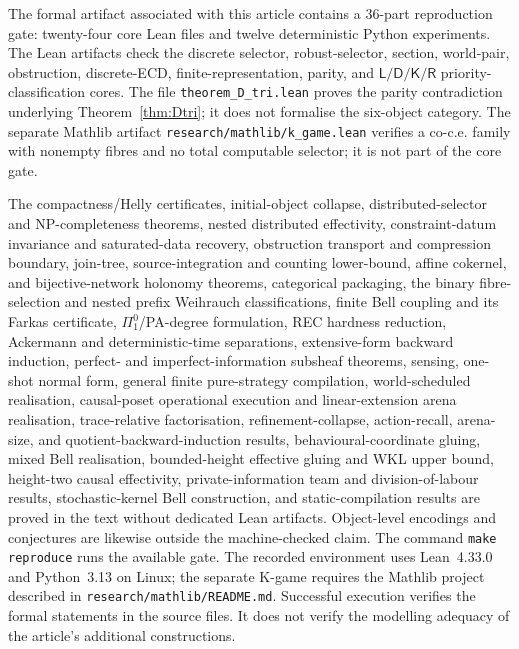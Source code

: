 \documentclass[11pt]{article}
\theoremstyle{plain}
\theoremstyle{definition}
\theoremstyle{remark}
\begin{document}
The formal artifact associated with this article contains a 36-part reproduction
gate: twenty-four core Lean files and twelve deterministic Python experiments.
The Lean artifacts check the discrete selector, robust-selector, section,
world-pair, obstruction, discrete-ECD, finite-representation, parity, and
$\mathsf L/\mathsf D/\mathsf K/\mathsf R$ priority-classification cores.
The file \texttt{theorem\_D\_tri.lean} proves the parity contradiction underlying
Theorem~\ref{thm:Dtri}; it does not formalise the six-object category. The
separate Mathlib artifact \texttt{research/mathlib/k\_game.lean} verifies a
co-c.e. family with nonempty fibres and no total computable selector; it is not
part of the core gate.

The compactness/Helly certificates, initial-object collapse, distributed-selector
and NP-completeness theorems, nested distributed effectivity,
constraint-datum invariance and saturated-data recovery, obstruction transport
and compression boundary, join-tree, source-integration and counting lower-bound, affine cokernel, and
bijective-network holonomy theorems, categorical packaging, the binary
fibre-selection and nested prefix Weihrauch classifications, finite Bell
coupling and its Farkas certificate, $\Pi^0_1$/PA-degree formulation, REC
hardness reduction, Ackermann and deterministic-time separations,
extensive-form backward induction, perfect- and imperfect-information subsheaf
theorems, sensing, one-shot normal form, general finite pure-strategy
compilation, world-scheduled realisation, causal-poset operational execution and
linear-extension arena realisation, trace-relative factorisation, refinement-collapse, action-recall, arena-size,
and quotient-backward-induction results,
behavioural-coordinate gluing, mixed Bell realisation, bounded-height effective
gluing and WKL upper bound, height-two causal effectivity,
private-information team and division-of-labour
results, stochastic-kernel Bell construction, and static-compilation results are
proved in the text without dedicated Lean artifacts. Object-level
encodings and conjectures are likewise outside the machine-checked claim. The
command \texttt{make reproduce} runs the available gate. The recorded environment
uses Lean~4.33.0 and Python~3.13 on Linux; the separate K-game requires the
Mathlib project described in \texttt{research/mathlib/README.md}. Successful execution verifies the formal statements in the source files. It
does not verify the modelling adequacy of the article's additional
constructions.
\end{document}
